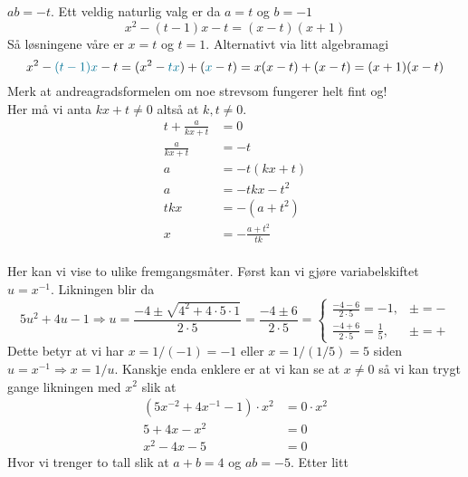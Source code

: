 \documentclass[a4paper,11pt]{article}
\begin{document}
\begin{solution}
  $ab = -t$.  Ett veldig naturlig valg er da $a = t$ og $b = -1$
  \begin{equation*}
    x^2 - (t-1)x - t = (x - t)(x + 1)
  \end{equation*}
  Så løsningene våre er $x = t$ og $t = 1$. Alternativt via litt algebramagi
  \begin{equation*}
    x^2 - \textcolor{UiT-blue}{(t-1)x} - t 
    = (x^2 - \textcolor{UiT-blue}{tx}) + (\textcolor{UiT-blue}{x} - t)
    = x(x - t) + (x - t)
    = (x + 1)(x - t)
  \end{equation*}
  Merk at andreagradsformelen om noe strevsom fungerer helt fint og! \\
   Her må vi anta $kx + t \neq 0$
  altså at $k,t \neq 0$. 
  \begin{align*}
    t + \frac{a}{kx + t} &= 0 \\
    \frac{a}{kx + t} &= -t \\
    a &= -t(kx + t) \\
    a &= -tkx - t^2 \\
    tkx &= -(a + t^2) \\
    x &= -\frac{a + t^2}{tk}
  \end{align*}
  \\
   Her kan vi vise to ulike
  fremgangsmåter. Først kan vi gjøre variabelskiftet $u = x^{-1}$. Likningen
  blir da
  \begin{equation*}
    5u^2 + 4u - 1
    \Rightarrow u = \frac{-4 \pm \sqrt{4^2 + 4\cdot 5 \cdot 1}}{2\cdot 5}
    = \frac{-4 \pm 6}{2 \cdot 5} =
    \begin{cases}
      \frac{-4-6}{2 \cdot 5} =          -1, &  \pm = - \\
      \frac{-4+6}{2 \cdot 5} = \frac{1}{5}, & \pm = +
    \end{cases}
  \end{equation*}
  Dette betyr at vi har $x = 1/(-1) = -1$ eller $x = 1/(1/5) = 5$ siden $u =
  x^{-1} \Rightarrow x = 1/u$. Kanskje enda enklere er at vi kan se at $x \neq
  0$ så vi kan trygt gange likningen med $x^2$ slik at 
  \begin{align*}
    (5x^{-2} + 4x^{-1} - 1) \cdot x^2 &= 0\cdot x^2 \\
    5 + 4x - x^2 &= 0 \\
    x^2 - 4x - 5 &= 0
  \end{align*}
  Hvor vi trenger to tall slik at $a + b = 4$ og $ab = -5$.  Etter litt

\end{solution}
\end{document}
